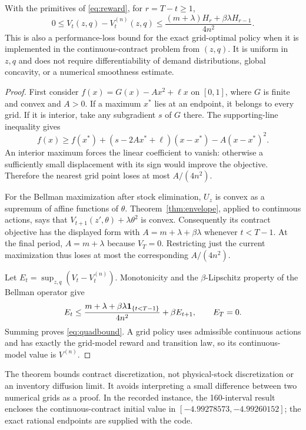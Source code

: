 \begin{theorem}\label{thm:quadratic}
With the primitives of \eqref{eq:reward}, for $r=T-t\geq1$,
\begin{equation}\label{eq:quadbound}
 0\leq V_t(z,q)-V_t^{(n)}(z,q)
 \leq\frac{(m+\lambda)H_r+\beta\lambda H_{r-1}}{4n^2}.
\end{equation}
This is also a performance-loss bound for the exact grid-optimal policy when it is implemented in the continuous-contract problem from $(z,q)$. It is uniform in $z,q$ and does not require differentiability of demand distributions, global concavity, or a numerical smoothness estimate.
\end{theorem}
\begin{proof}
First consider $f(x)=G(x)-A x^2+\ell x$ on $[0,1]$, where $G$ is finite and convex and $A>0$. If a maximum $x^*$ lies at an endpoint, it belongs to every grid. If it is interior, take any subgradient $s$ of $G$ there. The supporting-line inequality gives
\[
 f(x)\geq f(x^*)+(s-2Ax^*+\ell)(x-x^*)-A(x-x^*)^2.
\]
An interior maximum forces the linear coefficient to vanish: otherwise a sufficiently small displacement with its sign would improve the objective. Therefore the nearest grid point loses at most $A/(4n^2)$.

For the Bellman maximization after stock elimination, $U_z$ is convex as a supremum of affine functions of $\theta$. Theorem~\ref{thm:envelope}, applied to continuous actions, says that $V_{t+1}(z',\theta)+\lambda\theta^2$ is convex. Consequently its contract objective has the displayed form with $A=m+\lambda+\beta\lambda$ whenever $t<T-1$. At the final period, $A=m+\lambda$ because $V_T=0$. Restricting just the current maximization thus loses at most the corresponding $A/(4n^2)$.

Let $E_t=\sup_{z,q}(V_t-V_t^{(n)})$. Monotonicity and the $\beta$-Lipschitz property of the Bellman operator give
\[
 E_t\leq \frac{m+\lambda+\beta\lambda\mathbf 1_{\{t<T-1\}}}{4n^2}
                  +\beta E_{t+1},\qquad E_T=0.
\]
Summing proves \eqref{eq:quadbound}. A grid policy uses admissible continuous actions and has exactly the grid-model reward and transition law, so its continuous-model value is $V^{(n)}$.\end{proof}

The theorem bounds contract discretization, not physical-stock discretization or an inventory diffusion limit. It avoids interpreting a small difference between two numerical grids as a proof. In the recorded instance, the 160-interval result encloses the continuous-contract initial value in $[-4.99278573,-4.99260152]$; the exact rational endpoints are supplied with the code.

